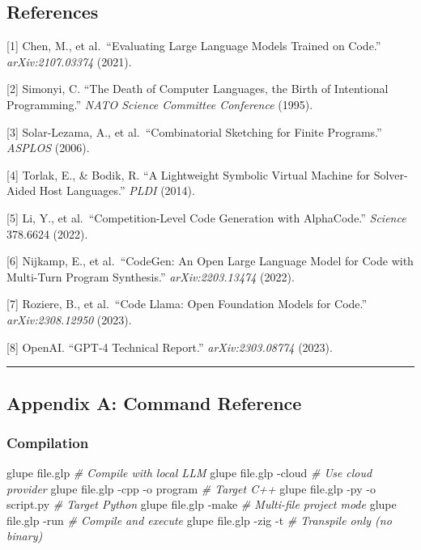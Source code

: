 \documentclass[11pt, a4paper]{article}
\newenvironment{Shaded}{\begin{snugshade}}{\end{snugshade}}
\newcommand{\AttributeTok}[1]{\textcolor[rgb]{0.77,0.63,0.00}{#1}}
\newcommand{\CommentTok}[1]{\textcolor[rgb]{0.56,0.35,0.01}{\textit{#1}}}
\newcommand{\ExtensionTok}[1]{#1}
\newcommand{\NormalTok}[1]{#1}
\begin{document}
\subsection{References}\label{references}

{[}1{]} Chen, M., et al.~``Evaluating Large Language Models Trained on
Code.'' \emph{arXiv:2107.03374} (2021).

{[}2{]} Simonyi, C. ``The Death of Computer Languages, the Birth of
Intentional Programming.'' \emph{NATO Science Committee Conference}
(1995).

{[}3{]} Solar-Lezama, A., et al.~``Combinatorial Sketching for Finite
Programs.'' \emph{ASPLOS} (2006).

{[}4{]} Torlak, E., \& Bodik, R. ``A Lightweight Symbolic Virtual
Machine for Solver-Aided Host Languages.'' \emph{PLDI} (2014).

{[}5{]} Li, Y., et al.~``Competition-Level Code Generation with
AlphaCode.'' \emph{Science} 378.6624 (2022).

{[}6{]} Nijkamp, E., et al.~``CodeGen: An Open Large Language Model for
Code with Multi-Turn Program Synthesis.'' \emph{arXiv:2203.13474}
(2022).

{[}7{]} Roziere, B., et al.~``Code Llama: Open Foundation Models for
Code.'' \emph{arXiv:2308.12950} (2023).

{[}8{]} OpenAI. ``GPT-4 Technical Report.'' \emph{arXiv:2303.08774}
(2023).

\begin{center}\rule{0.5\linewidth}{0.5pt}\end{center}

\subsection{Appendix A: Command
Reference}\label{appendix-a-command-reference}

\subsubsection{Compilation}\label{compilation}

\begin{Shaded}
\begin{Highlighting}[]
\ExtensionTok{glupe}\NormalTok{ file.glp                      }\CommentTok{\# Compile with local LLM}
\ExtensionTok{glupe}\NormalTok{ file.glp }\AttributeTok{{-}cloud}               \CommentTok{\# Use cloud provider}
\ExtensionTok{glupe}\NormalTok{ file.glp }\AttributeTok{{-}cpp} \AttributeTok{{-}o}\NormalTok{ program      }\CommentTok{\# Target C++}
\ExtensionTok{glupe}\NormalTok{ file.glp }\AttributeTok{{-}py} \AttributeTok{{-}o}\NormalTok{ script.py     }\CommentTok{\# Target Python}
\ExtensionTok{glupe}\NormalTok{ file.glp }\AttributeTok{{-}make}                \CommentTok{\# Multi{-}file project mode}
\ExtensionTok{glupe}\NormalTok{ file.glp }\AttributeTok{{-}run}                 \CommentTok{\# Compile and execute}
\ExtensionTok{glupe}\NormalTok{ file.glp }\AttributeTok{{-}zig} \AttributeTok{{-}t}              \CommentTok{\# Transpile only (no binary)}
\end{Highlighting}
\end{Shaded}
\end{document}
